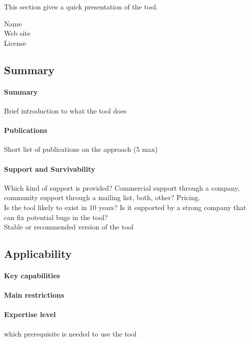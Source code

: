 This section gives a quick presentation of the tool.

\begin{description}
\item[Name] 
\item[Web site] 
\item[License] 
\end{description}

\subsection{Summary}
\paragraph{Summary} 
Brief introduction to what the tool does
\paragraph{Publications} Short list of publications on the approach (5 max)
\paragraph{Support and Survivability}
Which kind of support is provided? Commercial support through a
company, community support through a mailing list, both, other?
Pricing. \\
Is the tool likely to exist in 10 years? Is it supported by a strong
company that can fix potential bugs in the tool?\\

Stable or recommended version of the tool
\subsection{Applicability}
\paragraph{Key capabilities}
\paragraph{Main restrictions}
\paragraph{Expertise level}which prerequisite is needed to use the
tool

